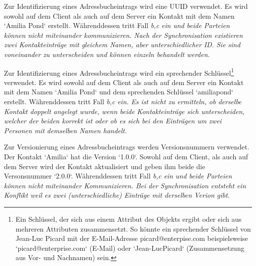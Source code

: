 %
%
\def \naturalkey {Ein Schlüssel, der sich aus einem Attribut des Objekts ergibt oder sich aus mehreren Attributen zusammensetzt. So könnte ein sprechender Schlüssel von Jean-Luc Picard mit der E-Mail-Adresse picard@enterpise.com beispielsweise `picard@enterprise.com` (E-Mail) oder `Jean-LucPicard` (Zusammensetzung aus Vor- und Nachnamen) sein.}
\def \logicalclock {Eine Logische Uhr ist eine Komponente die dazu dient, dem Datenobjekt einen eindeutigen Zeitstempel zuzuweisen. Die bekanntesten Verfahren für Logische Uhren in verteilten Systemen sind die Lamport-Uhr und die Vektoruhr. Beide verwenden Zähler die sich bei jedem Ereignis erhöhen. Einfach gesagt besteht die Lamport-Uhr aus einem Zeitstempel und einem Zähler, die Vektoruhr aus einem Zeitstempel und einem Vektor -- einer Liste aus Zählern.}
%
%
\begin{description}[leftmargin=0.5cm,style=nextline]
  \item[Szenario ID0:]
  Zur Identifizierung eines Adressbucheintrags wird eine \gls{UUID} verwendet. Es wird sowohl auf dem Client als auch auf dem Server ein Kontakt mit dem Namen `Amilia Pond` erstellt. Währenddessen tritt Fall \it{b,c} ein und beide Parteien können nicht miteinander kommunizieren. Nach der Synchronisation existieren zwei Kontakteinträge mit gleichem Namen, aber unterschiedlicher ID. Sie sind voneinander zu unterscheiden und können einzeln behandelt werden.\\
  \item[Szenario ID1:]
  Zur Identifizierung eines Adressbucheintrags wird ein sprechender Schlüssel\footnote{\naturalkey} verwendet.
  Es wird sowohl auf dem Client als auch auf dem Server ein Kontakt mit dem Namen `Amilia Pond` und dem sprechenden Schlüssel `amiliapond` erstellt. Währenddessen tritt Fall \it{b,c} ein. Es ist nicht zu ermitteln, ob derselbe Kontakt doppelt angelegt wurde, wenn beide Kontakteinträge sich unterscheiden, welcher der beiden korrekt ist oder ob es sich bei den Einträgen um zwei Personen mit demselben Namen handelt.\\
  \item[Szenario V0:]
  Zur Versionierung eines Adressbucheintrags werden Versionsnummern verwendet. Der Kontakt `Amilia` hat die Version `1.0.0`. Sowohl auf dem Client, als auch auf dem Server wird der Kontakt aktualisiert und geben ihm beide die Versonsnummer `2.0.0`. Währenddessen tritt Fall \it{b,c} ein und beide Parteien können nicht miteinander Kommunizieren. Bei der Synchronisation entsteht ein Konflikt weil es zwei (unterschiedliche) Einträge mit derselben Verion gibt.\\

\end{description}
